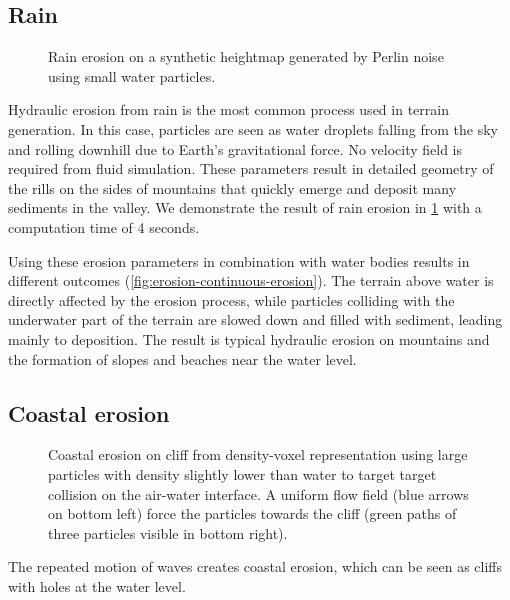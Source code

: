 \subsection{Rain}

\begin{figure}[H]
    \caption{Rain erosion on a synthetic heightmap generated by Perlin noise using small water particles. }
    \label{fig:erosion-results-rain}
\end{figure}

Hydraulic erosion from rain is the most common process used in terrain generation. In this case, particles are seen as water droplets falling from the sky and rolling downhill due to Earth's gravitational force. No velocity field is required from fluid simulation. These parameters result in detailed geometry of the rills on the sides of mountains that quickly emerge and deposit many sediments in the valley.  
We demonstrate the result of rain erosion in \cref{fig:erosion-results-rain} with a computation time of 4 seconds.%

Using these erosion parameters in combination with water bodies results in different outcomes (\cref{fig:erosion-continuous-erosion}). The terrain above water is directly affected by the erosion process, while particles colliding with the underwater part of the terrain are slowed down and filled with sediment, leading mainly to deposition. The result is typical hydraulic erosion on mountains and the formation of slopes and beaches near the water level.

\subsection{Coastal erosion}

\begin{figure}[H]
    \caption{Coastal erosion on cliff from density-voxel representation using large particles with density slightly lower than water to target target collision on the air-water interface. A uniform flow field (blue arrows on bottom left) force the particles towards the cliff (green paths of three particles visible in bottom right). }
    \label{fig:erosion-results-coastal}
\end{figure}

The repeated motion of waves creates coastal erosion, which can be seen as cliffs with holes at the water level.

